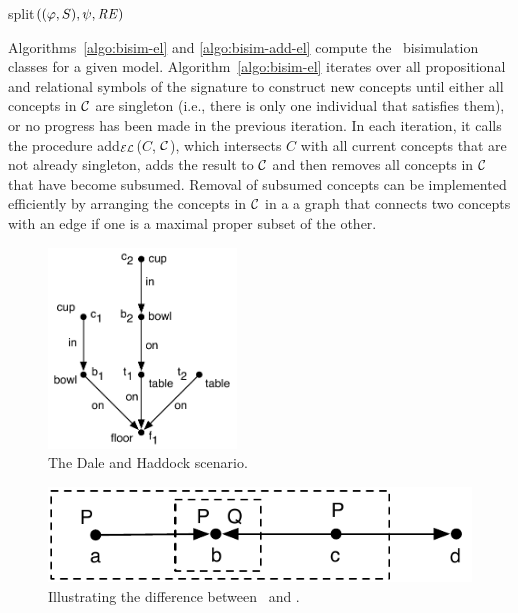 \begin{algorithm}
\caption{split$((\varphi,S),\psi, \mathit{RE})$}
\end{algorithm}

Algorithms~\ref{algo:bisim-el} and \ref{algo:bisim-add-el} compute
the \el\ bisimulation classes for a given model.
Algorithm~\ref{algo:bisim-el} iterates over all propositional and
relational symbols of the signature to construct new concepts until
either all concepts in $\mathcal{C}$ are singleton (i.e., there is only one
individual that satisfies them), or no progress has been made in the
previous iteration.  In each iteration, it calls the procedure
add$_\mathcal{EL}$($C$, $\mathcal{C}$), which intersects $C$ with all current concepts
that are not already singleton, adds the result to $\mathcal{C}$ and then
removes all concepts in $\mathcal{C}$ that have become subsumed.  Removal of
subsumed concepts can be implemented efficiently by arranging the
concepts in $\mathcal{C}$ in a a graph that connects two concepts with an edge
if one is a maximal proper subset of the other.

\begin{figure}
  \centering
  \includegraphics[width=5cm]{pic-dale-haddock}
  \caption{The Dale and Haddock scenario.}
  \label{fig:dale-haddock}
\end{figure}

\begin{figure}
  \centering
  \includegraphics[width=\columnwidth]{pic-el-vs-alc}
  \caption{Illustrating the difference between \el\ and \alc.}
  \label{fig:el-vs-alc}
\end{figure}

